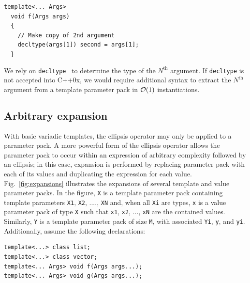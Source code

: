 \documentclass{article}
\begin{document}
\begin{verbatim}
template<... Args>
  void f(Args args)
  {
    // Make copy of 2nd argument
    decltype(args[1]) second = args[1];
  }
\end{verbatim}

We rely on \texttt{decltype}~\cite{JarviStroustrup04} to determine the
type of the $N^{\text{th}}$ argument. If \texttt{decltype} is not
accepted into C++0x, we would require additional syntax to extract the
$N^{\text{th}}$ argument from a template parameter pack in ${\cal
  O}(1)$ instantiations.

\subsection{Arbitrary expansion}
With basic variadic templates, the ellipsis operator may only be
applied to a parameter pack. A more powerful form of the ellipsis
operator allows the parameter pack to occur within an expression of
arbitrary complexity followed by an ellipsis; in this case, expansion
is performed by replacing parameter pack with each of its values and
duplicating the expression for each value. Fig.~\ref{fig:expansions}
illustrates the expansions of several template and value parameter
packs. In the figure, \texttt{X} is a template parameter pack
containing template parameters \texttt{X1}, \texttt{X2}, ....,
\texttt{XN} and, when all \texttt{Xi} are types, \texttt{x} is a value
parameter pack of type \texttt{X} such that \texttt{x1}, \texttt{x2},
..., \texttt{xN} are the contained values. Similarly, \texttt{Y} is a
template parameter pack of size \texttt{M}, with associated
\texttt{Yi}, \texttt{y}, and \texttt{yi}. Additionally, assume the
following declarations:
\begin{verbatim}
template<...> class list;
template<...> class vector;
template<... Args> void f(Args args...);
template<... Args> void g(Args args...);
\end{verbatim}
\end{document}
